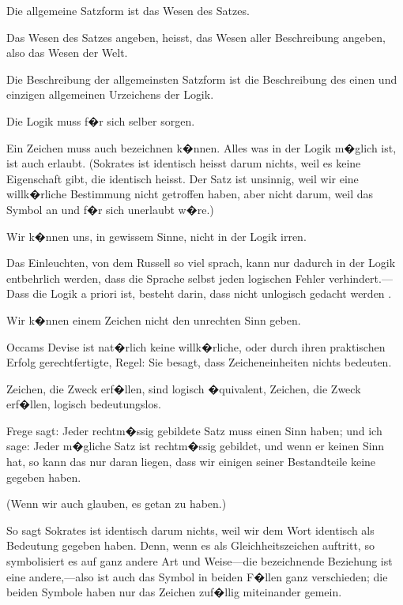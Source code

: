 {Die allgemeine Satzform ist das Wesen des
Satzes.}


{Das Wesen des Satzes angeben, heisst, das
Wesen aller Beschreibung angeben, also das
Wesen der Welt.}


{Die Beschreibung der allgemeinsten Satzform
ist die Beschreibung des einen und einzigen
allgemeinen Urzeichens der Logik.}


{Die Logik muss f�r sich selber sorgen.

Ein  Zeichen muss auch bezeichnen
k�nnen. Alles was in der Logik m�glich ist, ist
auch erlaubt. (\glqq{}Sokrates ist identisch\grqq{} heisst darum
nichts, weil es keine Eigenschaft gibt, die
\glqq{}identisch\grqq{} heisst. Der Satz ist unsinnig, weil
wir eine willk�rliche Bestimmung nicht getroffen
haben, aber nicht darum, weil das Symbol an und
f�r sich unerlaubt w�re.)

Wir k�nnen uns, in gewissem Sinne, nicht in
der Logik irren.}


{Das Einleuchten, von dem Russell so viel
sprach, kann nur dadurch in der Logik entbehrlich
werden, dass die Sprache selbst jeden logischen
Fehler ver\-hin\-dert.---Dass die Logik a priori ist,
besteht darin, dass nicht unlogisch gedacht werden
.}


{Wir k�nnen einem Zeichen nicht den unrechten
Sinn geben.}


{Occams Devise ist nat�rlich keine willk�rliche,
oder durch ihren praktischen Erfolg gerechtfertigte,
Regel: Sie besagt, dass  Zeicheneinheiten
nichts bedeuten.

Zeichen, die  Zweck erf�llen, sind logisch
�quivalent, Zeichen, die  Zweck erf�llen,
logisch bedeutungslos.}


{Frege sagt: Jeder rechtm�ssig gebildete Satz
muss einen Sinn haben; und ich sage: Jeder
m�gliche Satz ist rechtm�ssig gebildet, und wenn er
keinen Sinn hat, so kann das nur daran liegen, dass
wir einigen seiner Bestandteile keine 
gegeben haben.

(Wenn wir auch glauben, es getan zu haben.)

So sagt \glqq{}Sokrates ist identisch\grqq{} darum nichts,
weil wir dem Wort \glqq{}identisch\grqq{} als 
 Bedeutung gegeben haben. Denn,
wenn es als Gleichheitszeichen auftritt, so symbolisiert
es auf ganz andere Art und Weise---die
bezeichnende Beziehung ist eine an\-de\-re,---also ist
auch das Symbol in beiden F�llen ganz verschieden;
die beiden Symbole haben nur das Zeichen zuf�llig
miteinander gemein.}


